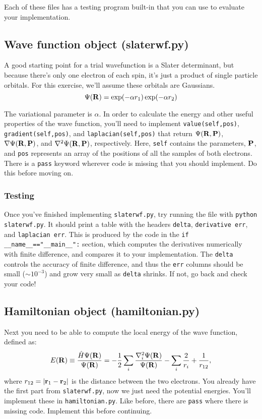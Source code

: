 \documentclass[12pt]{article}
\newcommand{\bR}{{\bf R}}
\newcommand{\br}{{\bf r}}
\newcommand{\bP}{{\bf P}}
\begin{document}
Each of these files has a testing program built-in that you can use to evaluate your implementation.

\subsection{Wave function object (slaterwf.py)}

A good starting point for a trial wavefunction is a Slater determinant, but because there's only one electron of each spin, it's just a product of single particle orbitals. 
For this exercise, we'll assume these orbitals are Gaussians.
\begin{equation}
\Psi(\bR)=\exp(-\alpha r_1) \exp(-\alpha r_2)	
\end{equation}

The variational parameter is $\alpha$.
In order to calculate the energy and other useful properties of the wave function, you'll need to implement \verb|value(self,pos)|, \verb|gradient(self,pos)|, and \verb|laplacian(self,pos)| that return $\Psi(\bR,\bP)$, $\nabla \Psi(\bR,\bP)$, and $\nabla^2 \Psi(\bR,\bP)$, respectively. 
Here, \verb|self| contains the parameters, $\bP$, and \verb|pos| represents an array of the positions of all the samples of both electrons. 
There is a \verb|pass| keyword wherever code is missing that you should implement. 
Do this before moving on.

\subsubsection{Testing}

Once you've finished implementing \verb|slaterwf.py|, try running the file with \verb|python slaterwf.py|. 
It should print a table with the headers \verb|delta|, \verb|derivative err|, and \verb|laplacian err|. 
This is produced by the code in the \verb|if __name__=="__main__":| section, which computes the derivatives numerically with finite difference, and compares it to your implementation. 
The \verb|delta| controls the accuracy of finite difference, and thus the \verb|err| columns should be small ($\sim 10^{-3}$) and grow very small as \verb|delta| shrinks.
If not, go back and check your code!

\subsection{Hamiltonian object (hamiltonian.py)}

Next you need to be able to compute the local energy of the wave function, defined as:
\begin{equation}
E(\bR)
\equiv
\frac{\hat{H}\Psi(\bR)}{\Psi(\bR) } = -\frac{1}{2} \sum_i \frac{\nabla_i^2 \Psi(\bR)}{\Psi(\bR)} - \sum_i \frac{2}{r_i} + \frac{1}{r_{12}},
\end{equation}
where $r_{12}=|\br_1-\br_2|$ is the distance between the two electrons.
You already have the first part from \verb|slaterwf.py|, now we just need the potential energies. 
You'll implement these in \verb|hamiltonian.py|. 
Like before, there are \verb|pass| where there is missing code. 
Implement this before continuing. 
\end{document}
